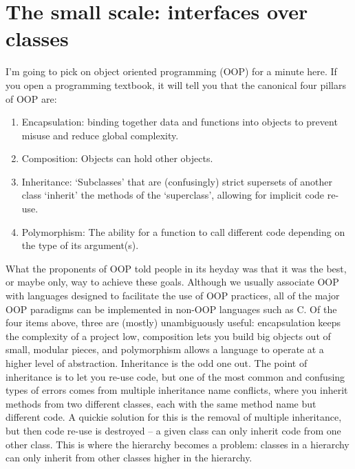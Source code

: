 \documentclass[12pt]{article}
\begin{document}
\section{The small scale: interfaces over classes}

I'm going to pick on object oriented programming (OOP) for a minute here. If you open a programming textbook, it will tell you that the canonical four
pillars of OOP are:

\begin{enumerate}
    \item Encapsulation: binding together data and functions into objects to prevent misuse and reduce global complexity.
    \item Composition: Objects can hold other objects.
    \item Inheritance: `Subclasses' that are (confusingly) strict supersets of another class `inherit' the methods of the `superclass', allowing for implicit code re-use.
    \item Polymorphism: The ability for a function to call different code depending on the type of its argument(s).
\end{enumerate}

What the proponents of OOP told people in its heyday was that it was the
best, or maybe only, way to achieve these goals. Although we usually associate
OOP with languages designed to facilitate the use of OOP practices, all of the
major OOP paradigms can be implemented in non-OOP languages such as C. Of the
four items above, three are (mostly) unambiguously useful: encapsulation keeps
the complexity of a project low, composition lets you build big objects out of
small, modular pieces, and polymorphism allows a language to operate at a
higher level of abstraction.  Inheritance is the odd one out. The point of
inheritance is to let you re-use code, but one of the most common and confusing
types of errors comes from multiple inheritance name conflicts, where you
inherit methods from two different classes, each with the same method name but
different code. A quickie solution for this is the removal of multiple
inheritance, but then code re-use is destroyed -- a given class can only
inherit code from one other class.  This is where the hierarchy becomes a
problem: classes in a hierarchy can only inherit from other classes higher in
the hierarchy.
\end{document}
